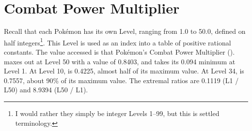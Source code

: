 \section{Combat Power Multiplier\label{sec:cpm}}
Recall that each Pokémon has its own Level, ranging from 1.0
 to 50.0, defined on half integers\footnote{I would rather they
 simply be integer Levels 1--99, but this is settled terminology.}.
This Level is used as an index into a table of positive rational constants.
The value accessed is that Pokémon's Combat Power Multiplier (\CPM).
\CPM{} maxes out at Level 50 with a value of 0.8403, and takes its
  0.094 minimum at Level 1.
At Level 10, \CPM{} is 0.4225, almost half of its maximum value.
At Level 34, \CPM{} is 0.7557, about 90\% of its maximum value.
The extremal ratios are 0.1119 (L1 / L50) and 8.9394 (L50 / L1).

